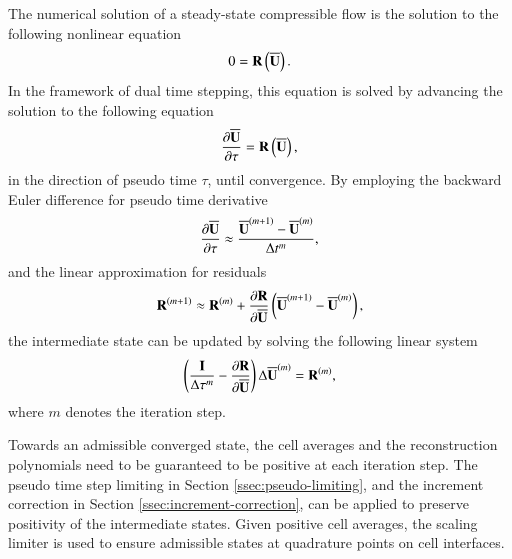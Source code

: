 The numerical solution of a steady-state compressible flow is the solution to the following nonlinear equation
\begin{equation}
    0 = \mathbf{R} \left(\overline{\mathbf{U}}\right).
\end{equation}
In the framework of dual time stepping, this equation is solved by advancing the solution to the following equation
\begin{equation}
    \dfrac{\partial \overline{\mathbf{U}}}{\partial \tau} = \mathbf{R} \left(\overline{\mathbf{U}}\right),
\end{equation}
in the direction of pseudo time $\tau$, until convergence. By employing the backward Euler difference for pseudo time derivative
\begin{equation}
    \dfrac{\partial \overline{\mathbf{U}}}{\partial \tau} \approx \dfrac{\overline{\mathbf{U}}^{(m+1)}-\overline{\mathbf{U}}^{(m)}}{\mathrm\Delta t^m},
\end{equation}
and the linear approximation for residuals
\begin{equation}
    \mathbf{R}^{(m+1)} \approx \mathbf{R}^{(m)} + \dfrac{\partial \mathbf{R}}{\partial \overline{\mathbf{U}}} \left(\overline{\mathbf{U}}^{(m+1)}-\overline{\mathbf{U}}^{(m)}\right),
\end{equation}
the intermediate state can be updated by solving the following linear system
\begin{equation}
    \left(\frac{\eye}{\inc \tau^m} -\partialderivative{\R }{\uu} \right) \inc \uu^{\left(m\right)}
    = \R^{\left(m\right)},
\end{equation}
where $m$ denotes the iteration step. 

Towards an admissible converged state, the cell averages and the reconstruction polynomials need to be guaranteed to be positive at each iteration step. The pseudo time step limiting in Section \ref{ssec:pseudo-limiting}, and the increment correction in Section \ref{ssec:increment-correction}, can be applied to preserve positivity of the intermediate states. Given positive cell averages, the scaling limiter is used to ensure admissible states at quadrature points on cell interfaces. 




\endgroup